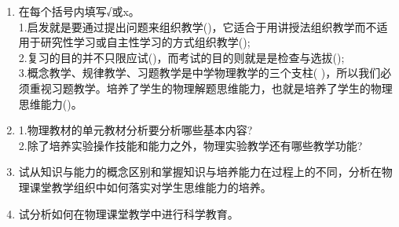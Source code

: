 \begin{enumerate}
(1)感应电动势的大小及回路中的电流的方向。\\
(2)作用在 ab 上的磁场力。
\begin{figure}[ht]
\centering
\texttt{[image: ./figures/976e2695e25477b5.png]}
\caption{} \label{fig_SSD103_5}
\end{figure}
\item 在每个括号内填写√或x。\\
1.启发就是要通过提出问题来组织教学()，它适合于用讲授法组织教学而不适用于研究性学习或自主性学习的方式组织教学();\\
2.复习的目的并不只限应试()，而考试的目的则就是是检查与选拔();\\
3.概念教学、规律教学、习题教学是中学物理教学的三个支柱( )，所以我们必须重视习题教学。培养了学生的物理解题思维能力，也就是培养了学生的物理思维能力()。
\item 1.物理教材的单元教材分析要分析哪些基本内容?\\
2.除了培养实验操作技能和能力之外，物理实验教学还有哪些教学功能?\\
\item 试从知识与能力的概念区别和掌握知识与培养能力在过程上的不同，分析在物理课堂教学组织中如何落实对学生思维能力的培养。
\item 试分析如何在物理课堂教学中进行科学教育。
\end{enumerate}
